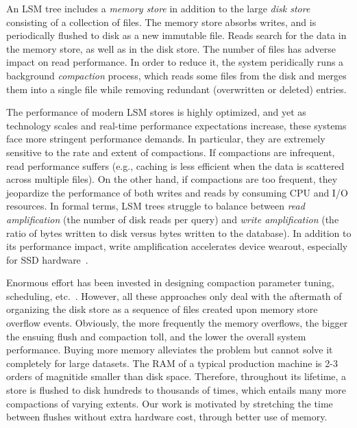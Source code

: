 An LSM tree includes a \emph{memory store} in addition to the large \emph{disk store} consisting of a collection of files. 
The memory store absorbs writes, and is periodically flushed to disk as a new immutable file. Reads search for the data
in the memory store, as well as in the disk store. The number of files has adverse impact on read performance. 
In order to reduce it, the system peridically runs a background \emph{compaction} process, which reads some files from 
the disk and merges them into a single file while removing redundant (overwritten or deleted) entries.

The performance of modern LSM stores is highly optimized, and yet as technology scales and real-time 
performance expectations increase, these systems face more stringent performance demands. In particular, 
they are extremely sensitive to the rate and extent of compactions. If compactions are infrequent, read performance
suffers (e.g., caching is less efficient when the data is scattered across multiple files). On the other hand, if 
compactions are too frequent, they jeopardize the performance of both writes and reads by consuming CPU 
and I/O resources. In formal terms, LSM trees struggle to balance between {\em read amplification} (the number 
of disk reads per query) and {\em write amplification} (the ratio of bytes written to disk versus bytes written to the 
database). In addition to its performance impact, write amplification accelerates device wearout, especially for SSD 
hardware~\cite{Hu:2009}. 

Enormous effort has been invested in designing compaction parameter tuning, scheduling, etc.~\cite{hbasetuning,
universalcompaction,scylladbcompaction,Sears:2012}. However, all these approaches only deal with the aftermath
of organizing the disk store as a sequence of files created upon memory store overflow events. Obviously, the more 
frequently the memory overflows, the bigger the ensuing flush and compaction toll, and the lower the overall 
system performance. Buying more memory alleviates the problem but cannot solve it completely for large datasets. 
The RAM of a typical production machine is 2-3 orders of magnitide smaller than disk space. Therefore, throughout 
its lifetime, a store is flushed to disk hundreds to thousands of times, which entails many more compactions of varying 
extents.  Our work is motivated by stretching the time between flushes without extra hardware cost, 
through better use of memory. 

